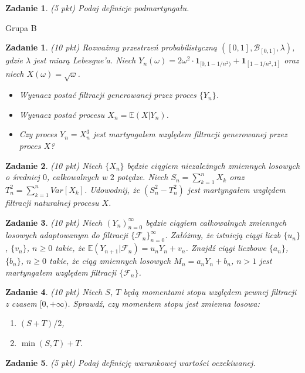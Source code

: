 \documentclass{mwart}
\newtheorem{zd}{Zadanie}
\newtheorem{zdt}{Zadanie }
\begin{document}
\begin{zd}(5 pkt)\newline
Podaj definicje podmartyngału.
\end{zd}

\noindent\makebox[\linewidth]{\rule{\paperwidth}{0.4pt}}
\newline
{\huge Grupa B}
\begin{zdt}(10 pkt)\newline
Rozważmy przestrzeń probabilistyczną $\left([0, 1], \mathcal{B}_{[0, 1]}, \lambda \right)$, gdzie $\lambda$ jest miarą Lebesgue'a. Niech $Y_n(\omega) = 2\omega^2\cdot \pmb{1}_{[0, 1 - 1/n^2)} + \pmb{1}_{[1-1/n^2, 1]}$ oraz niech $X(\omega) = \sqrt{\omega}$.
\begin{itemize}
\item Wyznacz postać filtracji generowanej przez proces $\{Y_n\}$.
\item Wyznacz postać procesu $X_n = \mathbb{E}\left(X|Y_n\right)$.
\item Czy proces $Y_n = X_n^3$ jest martyngałem względem filtracji generowanej przez proces $X$?
\end{itemize}
\end{zdt}

\begin{zdt}(10 pkt)\newline
Niech $\{X_n\}$ będzie ciągiem niezależnych zmiennych losowych o średniej $0$, całkowalnych w $2$ potędze. Niech $S_n = \sum_{k=1}^nX_k$ oraz $T_n^2 = \sum_{k=1}^nVar[X_k]$. Udowodnij, że $(S_n^2-T_n^2)$ jest martyngałem względem filtracji naturalnej procesu $X$.
\end{zdt}

\begin{zdt}(10 pkt)\newline
Niech $(Y_n)_{n=0}^{\infty}$ będzie ciągiem całkowalnych zmiennych losowych adaptowanym do filtracji $\{\mathcal{F}_n\}_{n=0}^{\infty}$. Załóżmy, że istnieją ciągi liczb $\{u_n\}$, $\{v_n\}$, $n\geq 0$ takie, że $\mathbb{E}(Y_{n+1}|\mathcal{F}_n) = u_nY_n + v_n$. Znajdź ciągi liczbowe $\{a_n\}$, $\{b_n\}$, $n\geq 0$ takie, że ciąg zmiennych losowych $M_n = a_nY_n + b_n$, $n> 1$ jest martyngałem względem filtracji  $\{\mathcal{F}_n\}$.
\end{zdt}

\begin{zdt}(10 pkt)\newline
Niech $S$, $T$ będą momentami stopu względem pewnej filtracji z czasem $[0, +\infty)$. Sprawdź, czy momentem stopu jest zmienna losowa:
\begin{enumerate}
\item $(S+T)/2$,
\item $\min(S, T) + T$.
\end{enumerate}
\end{zdt}

\begin{zdt}(5 pkt)\newline
Podaj definicję warunkowej wartości oczekiwanej.
\end{zdt}
\end{document}
